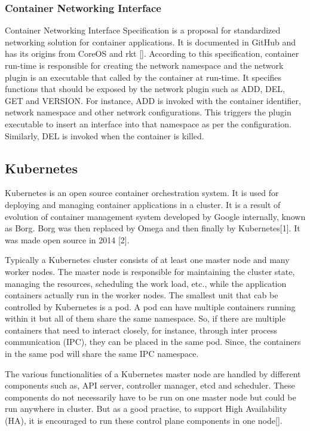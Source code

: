 \documentclass[english, 12pt, a4paper, elec, utf8, a-1b, online]{aaltothesis}
\begin{document}
\subsubsection{Container Networking Interface}
Container Networking Interface Specification is a proposal for standardized networking solution for container applications. It is documented in GitHub and has its origins from CoreOS and rkt []. According to this specification, container run-time is responsible for creating the network namespace and the network plugin is an executable that called by the container at run-time. It specifies functions that should be exposed by the network plugin such as ADD, DEL, GET and VERSION. For instance, ADD is invoked with the container identifier, network namespace and other network configurations. This triggers the plugin executable to insert an interface into that namespace as per the configuration. Similarly, DEL is invoked when the container is killed.

\subsection{Kubernetes}
Kubernetes is an open source container orchestration system. It is used for deploying and managing container applications in a cluster. It is a result of evolution of container management system developed by Google internally, known as Borg. Borg was then replaced by Omega and then finally by Kubernetes[1]. It was made open source in 2014 [2].

Typically a Kubernetes cluster consists of at least one master node and many worker nodes. The master node is responsible for maintaining the cluster state, managing the resources, scheduling the work load, etc., while the application containers actually run in the worker nodes. The smallest unit that cab be controlled by Kubernetes is a pod. A pod can have multiple containers running within it but all of them share the same namespace. So, if there are multiple containers that need to interact closely, for instance, through inter process communication (IPC), they can be placed in the same pod. Since, the containers in the same pod will share the same IPC namespace.

The various functionalities of a Kubernetes master node are handled by different components such as, API server, controller manager, etcd and scheduler. These components do not necessarily have to be run on one master node but could be run anywhere in cluster. But as a good practise, to support High Availability (HA), it is encouraged to run these control plane components in one node[].
\end{document}
